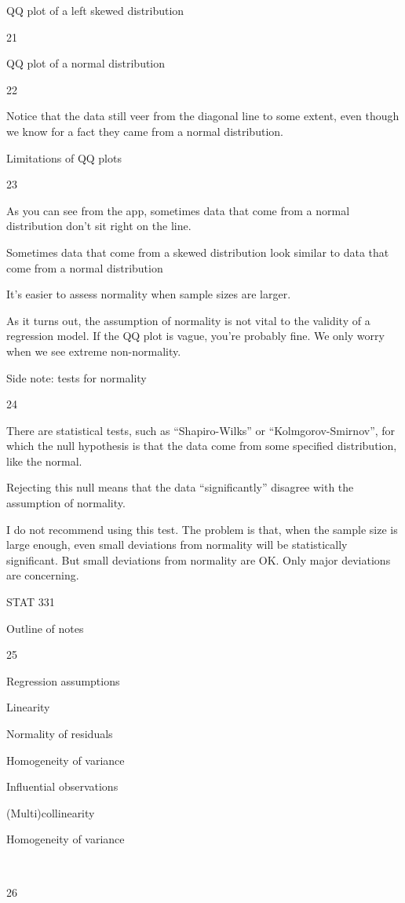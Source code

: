 \documentclass[
  letterpaper,
  DIV=11,
  numbers=noendperiod]{scrreprt}
\begin{document}
QQ plot of a left skewed distribution

21

QQ plot of a normal distribution

22

Notice that the data still veer from the diagonal line to some extent,
even though we know for a fact they came from a normal distribution.

Limitations of QQ plots

23

As you can see from the app, sometimes data that come from a normal
distribution don't sit right on the line.

Sometimes data that come from a skewed distribution look similar to data
that come from a normal distribution

It's easier to assess normality when sample sizes are larger.

As it turns out, the assumption of normality is not vital to the
validity of a regression model. If the QQ plot is vague, you're probably
fine. We only worry when we see extreme non-normality.

Side note: tests for normality

24

There are statistical tests, such as ``Shapiro-Wilks'' or
``Kolmgorov-Smirnov'', for which the null hypothesis is that the data
come from some specified distribution, like the normal.

Rejecting this null means that the data ``significantly'' disagree with
the assumption of normality.

I do not recommend using this test. The problem is that, when the sample
size is large enough, even small deviations from normality will be
statistically significant. But small deviations from normality are OK.
Only major deviations are concerning.

STAT 331

Outline of notes

25

Regression assumptions

Linearity

Normality of residuals

Homogeneity of variance

Influential observations

(Multi)collinearity

Homogeneity of variance

~

26
\end{document}
